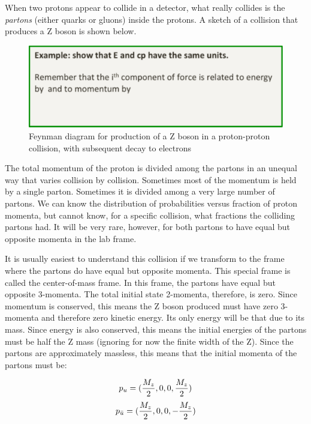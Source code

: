 When two protons appear to collide in a detector, what really collides is the {\it partons} (either quarks or gluons) inside the protons.  A sketch of a collision that produces a Z boson is shown below.
 

\begin{figure}[h]
\centering\includegraphics[scale=0.5]{./relativity/Pictures/fig1.pdf}
\caption{Feynman diagram for production of a Z boson in a proton-proton collision, with subsequent decay to electrons}
\label{fig:collrel}
\end{figure}




The total momentum of the proton is divided among the partons in an unequal way that varies collision by collision.  Sometimes most of the momentum is held by a single parton.  Sometimes it is divided among a very large number of partons.  We can know the distribution of probabilities versus fraction of proton momenta, but cannot know, for a specific collision, what fractions the colliding partons had.  It will be very rare, however, for both partons to have equal but opposite momenta in the lab frame.

It is usually easiest to understand this collision if we transform to the frame where the partons do have equal but opposite momenta.  This special frame is called the center-of-mass frame.  In this frame, the partons have equal but opposite 3-momenta.  The total initial state 2-momenta, therefore, is zero.  Since momentum is conserved, this means the Z boson produced must have zero 3-momenta and therefore zero kinetic energy.  Its only energy will be that due to its mass.  Since energy is also conserved, this means the initial energies of the partons must be half the Z mass (ignoring for now the finite width of the Z).  Since the partons are approximately massless, this means that the initial momenta of the partons must be:

\begin{equation}
 p_{u} = ( {M_z \over 2},0,0,{M_z \over 2})
\end{equation}
\begin{equation}
 p_{\bar{u}} = ( {M_z \over 2},0,0,-{M_z \over 2})
\end{equation}

